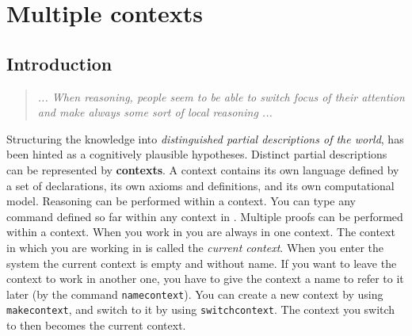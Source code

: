 \section{Multiple contexts}
\label{sec-cxt}

\subsection{Introduction}

\begin{quote}\em
  ... When reasoning, people seem to be able to switch focus of their
  attention and make always some sort of local reasoning ...
  \cite{giunchiglia2}
\end{quote}

Structuring the knowledge into {\em distinguished partial descriptions of the
world}, has been hinted as a cognitively plausible hypotheses. 
Distinct partial descriptions can be represented by {\GF} {\bf contexts}.
A {\GF} context contains its own language defined by a set of declarations, 
its own axioms and definitions, and its own computational model.
Reasoning can be performed within a context. 
You can type any command defined so far within any context in {\GF}.
Multiple proofs can be performed within a context.
When you work in {\GF} you are always in one context.
The context in which you are working in is called the {\em current context}.
When you enter the system the current context is empty and without name.
If you want to leave the context to work in another one, you have to give the
context a name to refer to it later (by the command {\tt namecontext}).
You can create a new context by using {\tt makecontext}, and  switch to it
by using {\tt switchcontext}.
The context you switch to then becomes the current context.
